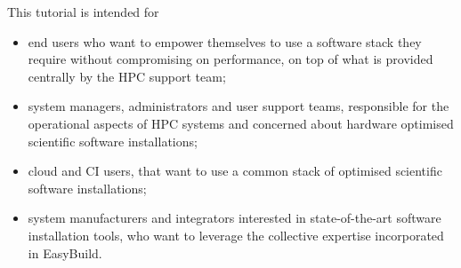 This tutorial is intended for
\begin{itemize}
    \item end users who want to empower themselves to use a software stack they require without compromising on
          performance, on top of what is provided centrally by the HPC support team;
    \item system managers, administrators and user support teams, responsible for the operational aspects of HPC systems and concerned about
          hardware optimised scientific software installations;
    \item cloud and CI users, that want to use a common stack of optimised scientific software installations;
    \item system manufacturers and integrators interested in state-of-the-art software installation tools, who want to
          leverage the collective expertise incorporated in EasyBuild.
\end{itemize}
